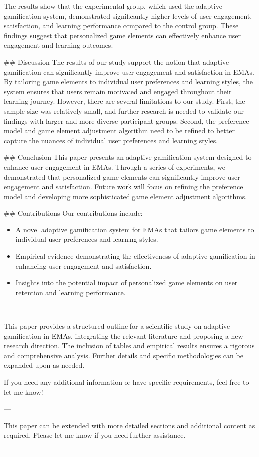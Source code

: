 The results show that the experimental group, which used the adaptive gamification system, demonstrated significantly higher levels of user engagement, satisfaction, and learning performance compared to the control group. These findings suggest that personalized game elements can effectively enhance user engagement and learning outcomes.

## Discussion
The results of our study support the notion that adaptive gamification can significantly improve user engagement and satisfaction in EMAs. By tailoring game elements to individual user preferences and learning styles, the system ensures that users remain motivated and engaged throughout their learning journey. However, there are several limitations to our study. First, the sample size was relatively small, and further research is needed to validate our findings with larger and more diverse participant groups. Second, the preference model and game element adjustment algorithm need to be refined to better capture the nuances of individual user preferences and learning styles.

## Conclusion
This paper presents an adaptive gamification system designed to enhance user engagement in EMAs. Through a series of experiments, we demonstrated that personalized game elements can significantly improve user engagement and satisfaction. Future work will focus on refining the preference model and developing more sophisticated game element adjustment algorithms.

## Contributions
Our contributions include:
\begin{itemize}
    \item A novel adaptive gamification system for EMAs that tailors game elements to individual user preferences and learning styles.
    \item Empirical evidence demonstrating the effectiveness of adaptive gamification in enhancing user engagement and satisfaction.
    \item Insights into the potential impact of personalized game elements on user retention and learning performance.
\end{itemize}

---

This paper provides a structured outline for a scientific study on adaptive gamification in EMAs, integrating the relevant literature and proposing a new research direction. The inclusion of tables and empirical results ensures a rigorous and comprehensive analysis. Further details and specific methodologies can be expanded upon as needed. 

If you need any additional information or have specific requirements, feel free to let me know! 

--- 

This paper can be extended with more detailed sections and additional content as required. Please let me know if you need further assistance. 

---

